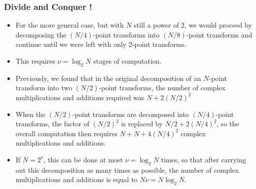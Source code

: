 \begin{frame}
\frametitle{Divide and Conquer !}
\begin{itemize}
\item For the more general case, but with $N$ still a power of 2, we would proceed by decomposing the $(N/4)$-point transforms  into $(N/8)$-point transforms and continue until we were left with only 2-point transforms. 
\item This  requires $\nu =\log_{2}N$ stages of computation. 
\item Previously, we found that in the original decomposition of an $N$-point transform into two $(N/2)$-point transforms, the number of complex multiplications and additions required was $N+2(N/2)^{2}$ 
\item When the $(N/2)$-point transforms are decomposed into $(N/4)$-point transforms, the factor of $(N/2)^{2}$ is replaced by $N/2+2(N/4)^{2}$, so the overall computation then requires $N+N+4(N/4)^{2}$ complex multiplications and additions. 
\item If $N=2^{\nu}$, this can be done at most $\nu=\log_{2}N$ times, so that after carrying out this decomposition as many times as possible, the number of complex multiplications and additions is equal to $N \nu=N\log_{2}N$.
\end{itemize}
\end{frame}


